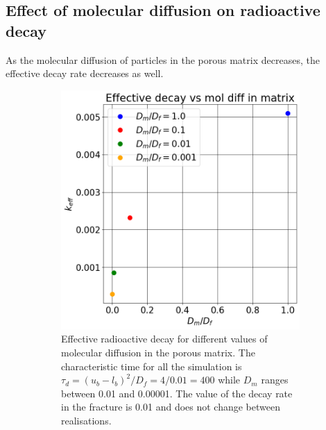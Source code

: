 \documentclass{article}
\begin{document}
\FloatBarrier  %
\subsection{Effect of molecular diffusion on radioactive decay}
As the molecular diffusion of particles in the porous matrix decreases, the effective decay rate decreases as well.
\begin{figure}[htbp]
    \centering
    \begin{subfigure}[b]{0.48\textwidth}
        \centering
        \includegraphics[width=\textwidth]{images/kEffVsDfDmRatio.png}
        \caption{Effective radioactive decay for different values of molecular diffusion in the porous matrix. The characteristic time for all the simulation is $\tau_d=(u_b-l_b)^2/D_f=4/0.01=400$ while $D_m$ ranges between 0.01 and 0.00001. The value of the decay rate in the fracture is 0.01 and does not change between realisations.}
    \end{subfigure}
    \hfill
    \begin{subfigure}[b]{0.48\textwidth}
        \centering

\end{subfigure}
\end{figure}
\end{document}
